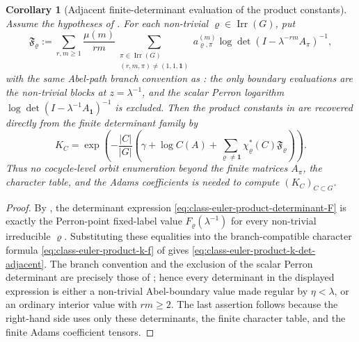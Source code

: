 \documentclass[11pt,a4paper]{amsart}
\theoremstyle{plain}
\newtheorem{corollary}[theorem]{Corollary}
\theoremstyle{definition}
\theoremstyle{remark}
\DeclareMathOperator{\Irr}{Irr}
\begin{document}
\begin{corollary}[Adjacent finite-determinant evaluation of the product constants]
  \label{cor:class-euler-product-determinant-evaluation}
  Assume the hypotheses of .  For each
  non-trivial \(\varrho\in\Irr(G)\), put
  \begin{equation}\label{eq:class-euler-product-determinant-F}
    \mathfrak F_\varrho:=
    \sum_{r,m\ge1}\frac{\mu(m)}{rm}
      \sum_{\substack{\pi\in\Irr(G)\\(r,m,\pi)\neq(1,1,\mathbf1)}}
        a_{\varrho,\pi}^{(m)}
        \log\det(I-\lambda^{-rm}A_\pi)^{-1},
  \end{equation}
  with the same Abel-path branch convention as
  : the only boundary
  evaluations are the non-trivial blocks at \(z=\lambda^{-1}\), and the
  scalar Perron logarithm \(\log\det(I-\lambda^{-1}A_{\mathbf1})^{-1}\)
  is excluded.  Then the product constants in
   are recovered directly from the
  finite determinant family by
  \begin{equation}\label{eq:class-euler-product-k-det-adjacent}
    K_C=
    \exp\!\left(
      -\frac{|C|}{|G|}
      \left(
        \gamma+\log C(A)
        +\sum_{\varrho\neq\mathbf1}
          \chi_\varrho^\ast(C)\mathfrak F_\varrho
      \right)
    \right).
  \end{equation}
  Thus no cocycle-level orbit enumeration beyond the finite matrices
  \(A_\pi\), the character table, and the Adams coefficients is needed to
  compute \((K_C)_{C\subset G}\).
\end{corollary}

\begin{proof}
  By , the determinant expression
  \eqref{eq:class-euler-product-determinant-F} is exactly the Perron-point
  fixed-label value \(F_\varrho(\lambda^{-1})\) for every non-trivial
  irreducible \(\varrho\).  Substituting these equalities into the
  branch-compatible character formula
  \eqref{eq:class-euler-product-k-f} of
   gives
  \eqref{eq:class-euler-product-k-det-adjacent}.  The branch convention and
  the exclusion of the scalar Perron determinant are precisely those of
  ; hence every determinant in
  the displayed expression is either a non-trivial Abel-boundary value made
  regular by \(\eta<\lambda\), or an ordinary interior value with
  \(rm\ge2\).  The last assertion follows because the right-hand side uses
  only these determinants, the finite character table, and the finite Adams
  coefficient tensors.
\end{proof}
\end{document}
